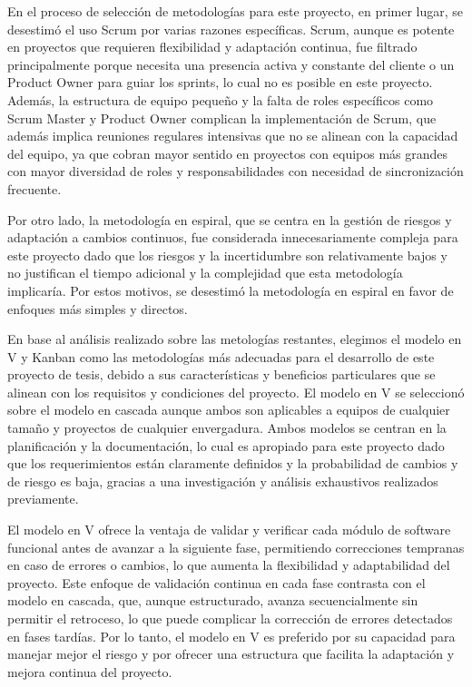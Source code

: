 \documentclass[main.tex]{subfiles}
\begin{document}
En el proceso de selección de metodologías para este proyecto, en primer lugar, se desestimó el uso Scrum por varias razones específicas. Scrum, aunque es potente en proyectos que requieren flexibilidad y adaptación continua, fue filtrado principalmente porque necesita una presencia activa y constante del cliente o un Product Owner para guiar los sprints, lo cual no es posible en este proyecto. Además, la estructura de equipo pequeño y la falta de roles específicos como Scrum Master y Product Owner complican la implementación de Scrum, que además implica reuniones regulares intensivas que no se alinean con la capacidad del equipo, ya que cobran mayor sentido en proyectos con equipos más grandes con mayor diversidad de roles y responsabilidades con necesidad de sincronización frecuente.

Por otro lado, la metodología en espiral, que se centra en la gestión de riesgos y adaptación a cambios continuos, fue considerada innecesariamente compleja para este proyecto dado que los riesgos y la incertidumbre son relativamente bajos y no justifican el tiempo adicional y la complejidad que esta metodología implicaría. Por estos motivos, se desestimó la metodología en espiral en favor de enfoques más simples y directos.

En base al análisis realizado sobre las metologías restantes, elegimos el modelo en V y Kanban como las metodologías más adecuadas para el desarrollo de este proyecto de tesis, debido a sus características y beneficios particulares que se alinean con los requisitos y condiciones del proyecto. El modelo en V se seleccionó sobre el modelo en cascada aunque ambos son aplicables a equipos de cualquier tamaño y proyectos de cualquier envergadura. Ambos modelos se centran en la planificación y la documentación, lo cual es apropiado para este proyecto dado que los requerimientos están claramente definidos y la probabilidad de cambios y de riesgo es baja, gracias a una investigación y análisis exhaustivos realizados previamente.

El modelo en V ofrece la ventaja de validar y verificar cada módulo de software funcional antes de avanzar a la siguiente fase, permitiendo correcciones tempranas en caso de errores o cambios, lo que aumenta la flexibilidad y adaptabilidad del proyecto. Este enfoque de validación continua en cada fase contrasta con el modelo en cascada, que, aunque estructurado, avanza secuencialmente sin permitir el retroceso, lo que puede complicar la corrección de errores detectados en fases tardías. Por lo tanto, el modelo en V es preferido por su capacidad para manejar mejor el riesgo y por ofrecer una estructura que facilita la adaptación y mejora continua del proyecto.
\end{document}
